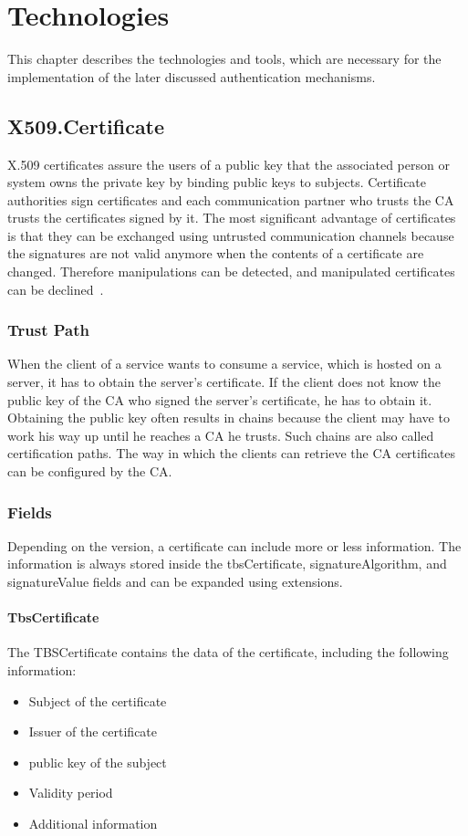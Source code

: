 \chapter{Technologies}
This chapter describes the technologies and tools, which are necessary for the implementation of the later discussed authentication mechanisms.

\section{X509.Certificate}
X.509 certificates assure the users of a public key that the associated person or system owns the private key by binding public keys to subjects.
Certificate authorities sign certificates and each communication partner who trusts the CA trusts the certificates signed by it.
The most significant advantage of certificates is that they can be exchanged using untrusted communication channels because the signatures are not valid anymore when the contents of a certificate are changed.
Therefore manipulations can be detected, and manipulated certificates can be declined~\cite{x509rfc}.

\subsection{Trust Path}
When the client of a service wants to consume a service, which is hosted on a server, it has to obtain the server's certificate.
If the client does not know the public key of the CA who signed the server's certificate, he has to obtain it.
Obtaining the public key often results in chains because the client may have to work his way up until he reaches a CA he trusts.
Such chains are also called certification paths.
The way in which the clients can retrieve the CA certificates can be configured by the CA.

\subsection{Fields}
Depending on the version, a certificate can include more or less information.
The information is always stored inside the tbsCertificate, signatureAlgorithm, and signatureValue fields and can be expanded using extensions.

\subsubsection{TbsCertificate}
The TBSCertificate contains the data of the certificate, including the following information:
\begin{itemize}
    \item Subject of the certificate
    \item Issuer of the certificate
    \item public key of the subject
    \item Validity period
    \item Additional information
\end{itemize}

